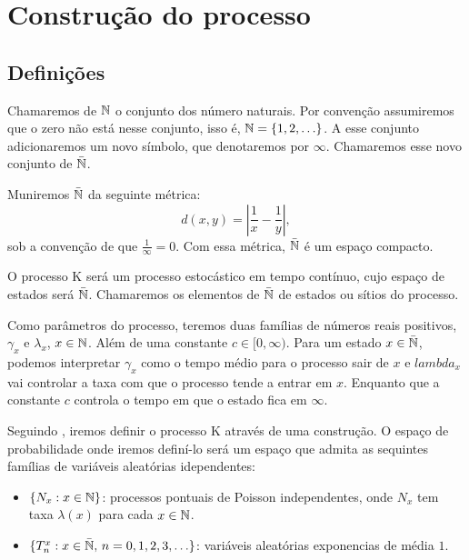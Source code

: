 \chapter{Construção do processo}
\label{cap:construcao}

\section{Definições}
\label{sec:definicoes}

Chamaremos de ${\mathbb{N}}$ o conjunto dos número naturais. Por convenção
assumiremos que o zero não está nesse conjunto, isso é, ${\mathbb{N}} = \{ 1, 2,
\ldots \}$. A esse conjunto adicionaremos um novo símbolo, que
denotaremos por $\infty$. Chamaremos esse novo conjunto de ${\bar{{\mathbb{N}}}}$.

Muniremos ${\bar{{\mathbb{N}}}}$ da seguinte métrica:
\begin{equation}
  \label{eq:metrica}
  d(x, y) = \left\lvert \frac{1}{x} - \frac{1}{y} \right\rvert,
\end{equation}
sob a convenção de que $\frac{1}{\infty} = 0$. Com essa métrica,
${\bar{{\mathbb{N}}}}$ é um espaço compacto. 

O processo K será um processo estocástico em tempo contínuo, cujo
espaço de estados será ${\bar{{\mathbb{N}}}}$. Chamaremos os elementos de ${\bar{{\mathbb{N}}}}$ de
estados ou sítios do processo.

Como parâmetros do processo, teremos duas famílias de números reais
positivos, $\gamma_x$ e $\lambda_x$, $x \in {\mathbb{N}}$. Além de uma constante
$c \in [0, \infty)$.
Para um estado $x \in {\bar{{\mathbb{N}}}}$, podemos interpretar $\gamma_x$ como
o tempo médio para o processo sair de $x$ e $lambda_x$
vai controlar a taxa com que o processo tende a entrar em
$x$. Enquanto que a constante $c$ controla o tempo em que o estado
fica em $\infty$.

Seguindo \cite{fontes:08}, iremos definir o processo K através de uma
construção. O espaço de probabilidade onde iremos definí-lo será um
espaço que admita as sequintes famílias de variáveis aleatórias
idependentes:

\begin{itemize}
  \item $\{ N_x: x \in {\mathbb{N}} \}$: processos pontuais de Poisson
    independentes, onde $N_x$ tem taxa $\lambda(x)$ para cada $x \in {\mathbb{N}}$.
  \item $\{T_n^x: x \in {\bar{{\mathbb{N}}}} , \, n = 0, 1, 2, 3, \ldots \}$:
    variáveis aleatórias exponencias de média $1$.
\end{itemize}

